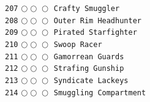\documentclass[a4paper,landscape]{article}
\begin{document}
\begin{multicols*}{5}
\texttt{207} \(\bigcirc\!\bigcirc\!\bigcirc\)  \texttt{Crafty Smuggler} \vspace{-0.3mm}\\ 
\texttt{208} \(\bigcirc\!\bigcirc\!\bigcirc\)  \texttt{Outer Rim Headhunter} \vspace{-0.3mm}\\ 
\texttt{209} \(\bigcirc\!\bigcirc\!\bigcirc\)  \texttt{Pirated Starfighter} \vspace{-0.3mm}\\ 
\texttt{210} \(\bigcirc\!\bigcirc\!\bigcirc\)  \texttt{Swoop Racer} \vspace{-0.3mm}\\ 
\texttt{211} \(\bigcirc\!\bigcirc\!\bigcirc\)  \texttt{Gamorrean Guards} \vspace{-0.3mm}\\ 
\texttt{212} \(\bigcirc\!\bigcirc\!\bigcirc\)  \texttt{Strafing Gunship} \vspace{-0.3mm}\\ 
\texttt{213} \(\bigcirc\!\bigcirc\!\bigcirc\)  \texttt{Syndicate Lackeys} \vspace{-0.3mm}\\ 
\texttt{214} \(\bigcirc\!\bigcirc\!\bigcirc\)  \texttt{Smuggling Compartment} \vspace{-0.3mm}\\ 

\end{multicols*}
\end{document}
